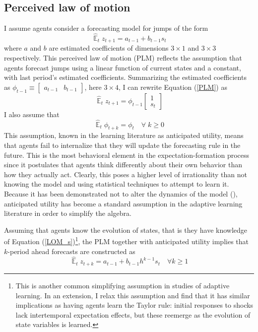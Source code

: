 \documentclass[11pt]{article}
\renewcommand{\[}{\begin{equation}}
\renewcommand{\]}{\end{equation}}
\DeclareMathOperator{\E}{\mathbb{E}}
\begin{document}
\subsection{Perceived law of motion}
I assume agents consider a forecasting model for jumps of the form
\begin{equation}
\hat{\E}_{t}z_{t+1} = a_{t-1} + b_{t-1} s_{t} \label{PLM}  
\end{equation}
where $a$ and $b$ are estimated coefficients of dimensions $3\times1$ and $3\times3$ respectively. This perceived law of motion (PLM) reflects the assumption that agents forecast jumps using a linear function of current states and a constant, with last period's estimated coefficients. Summarizing the estimated coefficients as $\phi_{t-1} \equiv \begin{bmatrix}a_{t-1} & b_{t-1}\end{bmatrix}$, here $3\times 4$, I can rewrite Equation (\ref{PLM}) as 
\begin{equation} 
\hat{\E}_t z_{t+1} = \phi_{t-1}\begin{bmatrix} 1 \\ s_{t} \end{bmatrix} \label{PLMcompact}
\end{equation}
I also assume that 
\begin{equation}
\hat{\E}_{t}{\phi_{t+k}} = \phi_{t} \quad \forall \; k\geq0 
\end{equation}
This assumption, known in the learning literature as anticipated utility, means that agents fail to internalize that they will update the forecasting rule in the future. This is the most behavioral element in the expectation-formation process since it postulates that agents think differently about their own behavior than how they actually act. Clearly, this poses a higher level of irrationality than not knowing the model and using statistical techniques to attempt to learn it. Because it has been demonstrated not to alter the dynamics of the model (\cite{sargent1999}), anticipated utility has become a standard assumption in the adaptive learning literature in order to simplify the algebra.

Assuming that agents know the evolution of states, that is they have knowledge of Equation (\ref{LOM_s})\footnote{This is another common simplifying assumption in studies of adaptive learning. In an extension, I relax this assumption and find that it has similar implications as having agents learn the Taylor rule: initial responses to shocks lack intertemporal expectation effects, but these reemerge as the evolution of state variables is learned.}, the PLM together with anticipated utility implies that $k$-period ahead forecasts are constructed as
\begin{equation}
\hat{\E}_t z_{t+k} = a_{t-1} + b_{t-1}h^{k-1}s_t  \quad \forall k\geq 1 \label{PLM_fcst_general}
\end{equation}
\end{document}
